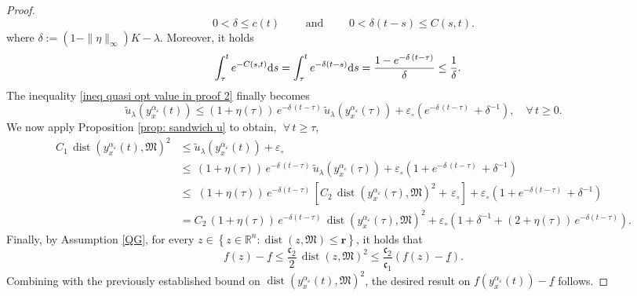 \documentclass[12pt]{amsart}
\newcommand{\D}[1]{\mbox{\rm #1}}
\newcommand{\dd}{\D{d}}
\numberwithin{equation}{section}
\theoremstyle{plain}
\begin{document}
\begin{proof}
\begin{equation*}
    0< \delta \leq c(t) \quad\quad \text{ and } \quad\quad 0< \delta(t-s) \leq C(s,t).
\end{equation*}
where $\delta := (1-\|\eta\|_{\infty})K - \lambda$. \;  
Moreover, it holds
\begin{equation*}
\begin{aligned}
    \int_{\tau}^{t}e^{-C(s,t)}\dd s
    & = \int_{\tau}^{t}e^{-\delta(t-s)} \dd s = \frac{1 - e^{-\delta \,(t-\tau)}}{\delta} \leq \frac{1}{\delta}.
\end{aligned}
\end{equation*}
The inequality \eqref{ineq quasi opt value in proof 2} finally becomes
\begin{equation*}
    \tilde{u}_{\lambda}(y_{x}^{\alpha_{\varepsilon}}(t)) \leq (1+\eta(\tau))\, e^{-\delta\, (t-\tau)}\,\tilde{u}_{\lambda}(y_{x}^{\alpha_{\varepsilon}}(\tau)) + \varepsilon_{\circ} \left(e^{-\delta\,(t-\tau)}\,+\delta^{-1}\right), \quad \forall\,t\geq0.
\end{equation*}
We now apply  Proposition \ref{prop: sandwich u} to obtain, $\; \forall\,t\geq\tau$,
\begin{equation*}
\begin{aligned}
    C_{1}\,\operatorname{dist}(y_{x}^{\alpha_{\varepsilon}}(t),\mathfrak{M})^{2}  
    & \leq \tilde{u}_{\lambda}(y_{x}^{\alpha_{\varepsilon}}(t)) + \varepsilon_{\circ} \\
    & \leq \, (1+\eta(\tau))\, e^{-\delta\, (t-\tau)}\,\tilde{u}_{\lambda}(y_{x}^{\alpha_{\varepsilon}}(\tau)) + \varepsilon_{\circ} \left(1+e^{-\delta\,(t-\tau)}\,+\delta^{-1}\right) \\
    & \leq \; (1+\eta(\tau))\, e^{-\delta(t-\tau)}\,\left[C_{2}\,\operatorname{dist}(y_{x}^{\alpha_{\varepsilon}}(\tau),\mathfrak{M})^{2} + \,\varepsilon_{\circ}\right] 
    + \varepsilon_{\circ} \left(1+e^{-\delta(t-\tau)}\,+\delta^{-1}\right) \\
    & = C_{2}\,(1+\eta(\tau))\, e^{-\delta(t-\tau)}\,\operatorname{dist}(y_{x}^{\alpha_{\varepsilon}}(\tau),\mathfrak{M})^{2} + 
    \varepsilon_{\circ}\left(1+\delta^{-1} + (2+\eta(\tau))\, e^{-\delta(t-\tau)}\right).
    \end{aligned}
\end{equation*}
Finally, by Assumption \ref{QG}, for every $z\in \left\{z\in\mathbb{R}^{n}: \operatorname{dist}(z,\mathfrak{M})\leq \mathbf{r}\right\}$, it holds that 
\begin{equation*}
    f(z)-\underline{f}\le \frac{\mathfrak c_2}{2}\,\operatorname{dist}(z,\mathfrak M)^2\leq\frac{\mathfrak{c}_2}{\mathfrak{c}_1}(f(z)-\underline{f}).
\end{equation*}
Combining  with the previously established bound on $\operatorname{dist}(y_x^{\alpha_\varepsilon}(t),\mathfrak M)^2$, the desired result on $f(y_x^{\alpha_\varepsilon}(t))-\underline{f}$ follows.
\end{proof}
\end{document}
